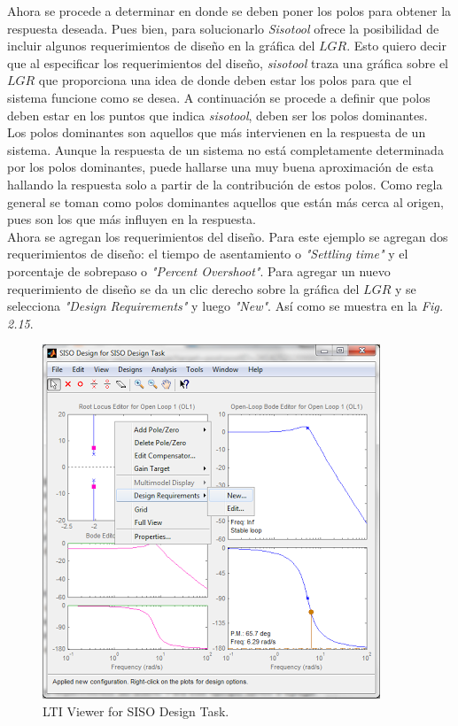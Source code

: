 \documentclass[a4paper,12pt,twoside]{proyectotanquesecci}
\begin{document}
Ahora se procede a determinar en donde se deben poner los polos para obtener la respuesta deseada. Pues bien, para solucionarlo \textit{Sisotool} ofrece la posibilidad de incluir algunos requerimientos de diseño en la gráfica del $LGR$. Esto quiero decir que al especificar los requerimientos del diseño, \textit{sisotool} traza una gráfica sobre el $LGR$ que proporciona una idea de donde deben estar los polos para que el sistema funcione como se desea. A continuación se procede a definir que polos deben estar en los puntos que indica \textit{sisotool}, deben ser los polos dominantes. \\

Los polos dominantes son aquellos que más intervienen en la respuesta de un sistema. Aunque la respuesta de un sistema no está completamente determinada por los polos dominantes, puede hallarse una muy buena aproximación de esta hallando la respuesta solo a partir de la contribución de estos polos. Como regla general se toman como polos dominantes aquellos que están más cerca al origen, pues son los que más influyen en la respuesta. \\

Ahora se agregan los requerimientos del diseño. Para este ejemplo se agregan dos requerimientos de diseño: el tiempo de asentamiento o \textit{"Settling time"} y el porcentaje de sobrepaso o \textit{"Percent Overshoot"}. Para agregar un nuevo requerimiento de diseño se da un clic derecho sobre la gráfica del $LGR$ y se selecciona \textit{"Design Requirements"} y luego \textit{"New"}. Así como se muestra en la \textit{Fig. 2.15}. \\

\begin{figure}[h]
\centering
\includegraphics[scale=0.6]{Ventana9}
\renewcommand{\figurename}{Fig.}
\caption{LTI Viewer for SISO Design Task.}
\label{LTI Viewer for SISO Design Task.}
\end{figure}
\end{document}
